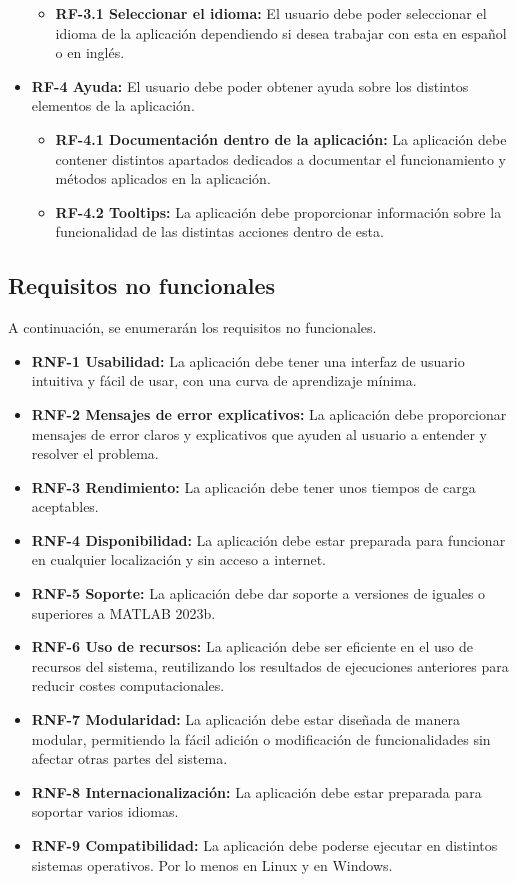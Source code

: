 \begin{itemize}
\begin{itemize}
        \item \textbf{RF-3.1 Seleccionar el idioma:} El usuario debe poder seleccionar el idioma de la aplicación dependiendo si desea trabajar con esta en español o en inglés. 
    \end{itemize}
    \item \textbf{RF-4 Ayuda:} El usuario debe poder obtener ayuda sobre los distintos elementos de la aplicación.
    \begin{itemize}
        \item \textbf{RF-4.1 Documentación dentro de la aplicación:} La aplicación debe contener distintos apartados dedicados a documentar el funcionamiento y métodos aplicados en la aplicación. 
        \item \textbf{RF-4.2 Tooltips:} La aplicación debe proporcionar información sobre la funcionalidad de las distintas acciones dentro de esta.
    \end{itemize}
\end{itemize}

\subsection{Requisitos no funcionales}\label{requisitos-no-funcionales}

A continuación, se enumerarán los requisitos no funcionales.

\begin{itemize}
    \item \textbf{RNF-1 Usabilidad:} La aplicación debe tener una interfaz de usuario intuitiva y fácil de usar, con una curva de aprendizaje mínima.
    \item \textbf{RNF-2 Mensajes de error explicativos:} La aplicación debe proporcionar mensajes de error claros y explicativos que ayuden al usuario a entender y resolver el problema.
    \item \textbf{RNF-3 Rendimiento:} La aplicación debe tener unos tiempos de carga aceptables.
    \item \textbf{RNF-4 Disponibilidad:} La aplicación debe estar preparada para funcionar en cualquier localización y sin acceso a internet.
    \item \textbf{RNF-5 Soporte:} La aplicación debe dar soporte a versiones de iguales o superiores a MATLAB 2023b.
    \item \textbf{RNF-6 Uso de recursos:} La aplicación debe ser eficiente en el uso de recursos del sistema, reutilizando los resultados de ejecuciones anteriores para reducir costes computacionales.
    \item \textbf{RNF-7 Modularidad:} La aplicación debe estar diseñada de manera modular, permitiendo la fácil adición o modificación de funcionalidades sin afectar otras partes del sistema.
    \item \textbf{RNF-8 Internacionalización:} La aplicación debe estar preparada para soportar varios idiomas.
    \item \textbf{RNF-9 Compatibilidad:} La aplicación debe poderse ejecutar en distintos sistemas operativos. Por lo menos en Linux y en Windows.
\end{itemize}

